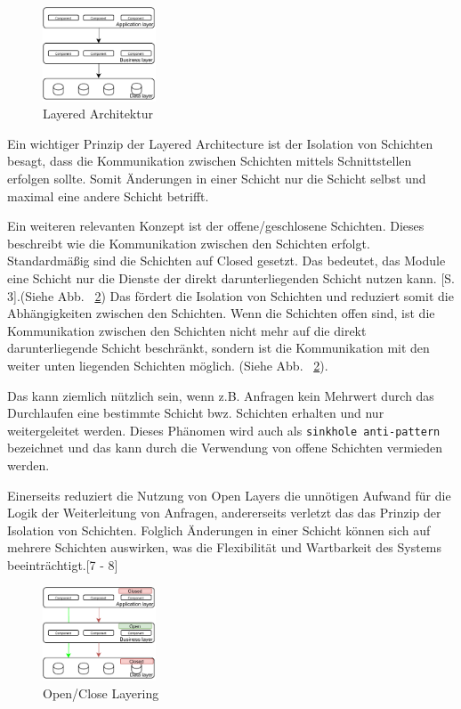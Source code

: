 \documentclass[acmtog]{acmart}
\begin{document}
\begin{figure}[h!]
    \centering
    \includegraphics[width=0.3\textwidth]{images/layer.pdf}
    \caption{Layered Architektur}
    \label{fig:layered}
\end{figure}

Ein wichtiger Prinzip der Layered Architecture ist der Isolation von Schichten besagt, dass die Kommunikation
zwischen Schichten mittels Schnittstellen erfolgen sollte.
Somit Änderungen in einer Schicht nur die Schicht selbst und maximal eine andere Schicht betrifft. \cite[10]{layered}

Ein weiteren relevanten Konzept ist der offene/geschlosene Schichten.
Dieses beschreibt wie die Kommunikation zwischen den Schichten erfolgt.
Standardmäßig sind die Schichten auf Closed gesetzt.
Das bedeutet, das Module eine Schicht nur die Dienste der direkt darunterliegenden Schicht nutzen kann.
\cite{layered}[S. 3].(Siehe Abb. ~\ref{fig:layered-request-flow})
Das fördert die Isolation von Schichten und reduziert somit die Abhängigkeiten zwischen den Schichten.
Wenn die Schichten offen sind, ist die Kommunikation zwischen den Schichten nicht mehr auf die direkt darunterliegende
Schicht beschränkt, sondern ist die Kommunikation mit den weiter unten liegenden Schichten möglich.
(Siehe Abb. ~\ref{fig:layered-request-flow}). \cite[4]{layered}

Das kann ziemlich nützlich sein, wenn z.B. Anfragen kein Mehrwert durch das
Durchlaufen eine bestimmte Schicht bwz. Schichten erhalten und nur weitergeleitet werden.
Dieses Phänomen wird auch als \texttt{sinkhole anti-pattern} bezeichnet und das kann durch die
Verwendung von offene Schichten vermieden werden.

Einerseits reduziert die Nutzung von Open Layers die unnötigen Aufwand für die Logik der Weiterleitung von Anfragen,
 andererseits verletzt das das Prinzip der Isolation von Schichten.
Folglich Änderungen in einer Schicht können sich auf mehrere Schichten auswirken, was die Flexibilität und Wartbarkeit
des Systems beeinträchtigt.[7 - 8]\cite{layered}

\begin{figure}[h!]
    \centering
    \includegraphics[width=0.3\textwidth]{images/layer2.pdf}
    \caption{Open/Close Layering}
    \label{fig:layered-request-flow}
\end{figure}
\end{document}
